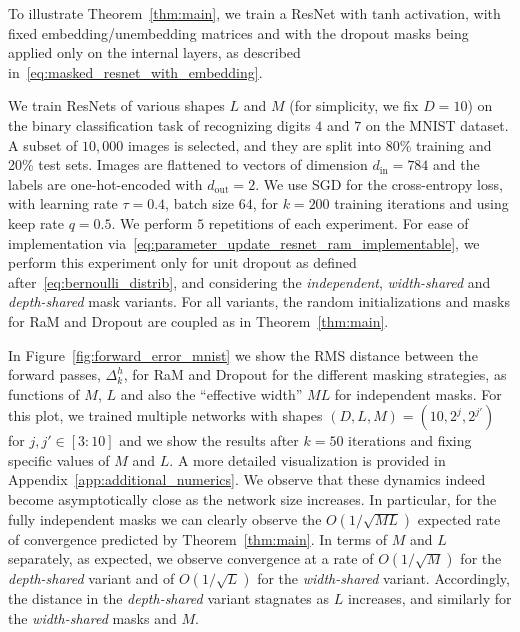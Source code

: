 \documentclass[a4paper,11pt]{article}
\newcommand{\1}{\mathbbm{1}}
\newcommand{\dimin}{d_{\mathrm{in}}}
\newcommand{\dimout}{d_{\mathrm{out}}}
\theoremstyle{definition}
\theoremstyle{remark}
\begin{document}
To illustrate Theorem~\ref{thm:main}, we train a ResNet with $\mathrm{tanh}$ activation, with fixed embedding/unembedding matrices and with the dropout masks being applied only on the internal layers, as described in~\eqref{eq:masked_resnet_with_embedding}.

We train ResNets of various shapes $L$ and $M$ (for simplicity, we fix $D=10$) on the binary classification task of recognizing digits $4$ and $7$ on the MNIST dataset. A subset of $10,000$ images is selected, and they are split into 80\% training and 20\% test sets. Images are flattened to vectors of dimension $\dimin = 784$ and the labels are one-hot-encoded with $\dimout = 2$.
We use SGD for the cross-entropy loss, with learning rate $\tau = 0.4$, batch size $64$, for $k = 200$ training iterations and using keep rate $q = 0.5$. We perform $5$ repetitions of each experiment. For ease of implementation via~\eqref{eq:parameter_update_resnet_ram_implementable}, we perform this experiment only for unit dropout as defined after~\eqref{eq:bernoulli_distrib}, and considering the \emph{independent}, \emph{width-shared} and \emph{depth-shared} mask variants. For all variants, the random initializations and masks for RaM and Dropout are coupled as in Theorem~\ref{thm:main}.

In Figure~\ref{fig:forward_error_mnist} we show the RMS distance between the forward passes, $\Delta^h_k$, for RaM and Dropout for the different masking strategies, as functions of $M$, $L$ and also the ``effective width'' $ML$ for independent masks. For this plot, we trained multiple networks with shapes $(D,L,M) = (10, 2^{j}, 2^{j'})$ for $j,j'\in[3:10]$ and we show the results after $k=50$ iterations and fixing specific values of $M$ and $L$. A more detailed visualization is provided in Appendix~\ref{app:additional_numerics}. We observe that these dynamics indeed become asymptotically close as the network size increases. In particular, for the fully independent masks we can clearly observe the $O(1/\sqrt{ML})$ expected rate of convergence predicted by Theorem~\ref{thm:main}.
In terms of $M$ and $L$ separately, as expected, we observe convergence at a rate of $O(1/\sqrt{M})$ for the \emph{depth-shared} variant and of $O(1/\sqrt{L})$ for the \emph{width-shared} variant. Accordingly, the distance in the \emph{depth-shared} variant stagnates as $L$ increases, and similarly for the \emph{width-shared} masks and $M$.
\end{document}
